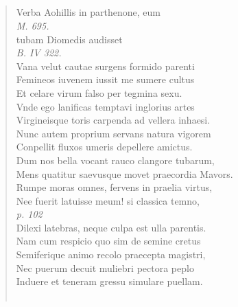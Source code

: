 \documentclass[11pt, a4paper]{report}
\begin{document}
            \subsection*{}
      \begin{verse}
      Verba Aohillis in parthenone, eum \\ \textit{M. 695.} \\ tubam Diomedis audisset \\ \textit{B. IV 322.} \\ Vana velut cautae surgens formido parenti \\ Femineos iuvenem iussit me sumere cultus \\ Et celare virum falso per tegmina sexu. \\ Vnde ego lanificas temptavi inglorius artes \\ Virgineisque toris carpenda ad vellera inhaesi. \\ Nunc autem proprium servans natura vigorem \\ Conpellit fluxos umeris depellere amictus. \\ Dum nos bella vocant rauco clangore tubarum, \\ Mens quatitur saevusque movet praecordia Mavors. \\ Rumpe moras omnes, fervens in praelia virtus, \\ Nee fuerit latuisse meum! si classica temno, \\ \textit{p. 102} \\ Dilexi latebras, neque culpa est ulla parentis. \\ Nam cum respicio quo sim de semine cretus \\ Semiferique animo recolo praecepta magistri, \\ Nec puerum decuit muliebri pectora peplo \\ Induere et teneram gressu simulare puellam. \\ 
        ﻿\pagebreak 

\end{verse}
\end{document}
